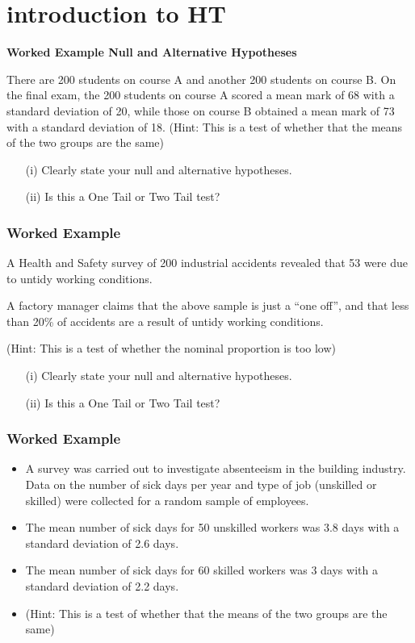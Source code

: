 \documentclass[]{report}
\begin{document}
	
\section{introduction to HT}
\noindent \textbf{Worked Example Null and Alternative Hypotheses}
{
	There are 200 students on course A and another 200 students on course B.  On the final exam, the 200 students on course A scored a mean mark of 68 with a standard deviation of 20, while those on course B obtained a mean mark of 73 with a standard deviation of 18.  
	(Hint: This is a test of whether that the means of the two groups are the same)
	
	\begin{itemize}
		\item[(i)] Clearly state your null and alternative hypotheses.
		\item[(ii)] Is this a One Tail or Two Tail test?
	\end{itemize}
	
\subsubsection{Worked Example}
A Health and Safety survey of 200 industrial accidents revealed that 53 
were due to untidy working conditions.  

A factory manager claims that the above sample is just a “one off”, and that less than 20\% of accidents are a result of untidy working conditions. 

(Hint: This is a test of whether the nominal proportion is too low)
\begin{itemize}
	\item[(i)] Clearly state your null and alternative hypotheses.
	\item[(ii)] Is this a One Tail or Two Tail test?
\end{itemize}

\subsubsection{Worked Example}

\begin{itemize}
	\item 	A survey was carried out to investigate absenteeism in the building industry.
	Data on the number of sick days per year and type of job (unskilled or skilled)
	were collected for a random sample of employees.
	\item The mean number of sick days for 50 unskilled workers was 3.8 days with a standard deviation of 2.6 days. 
	\item The mean number of sick days for 60 skilled workers was 3 days with a standard deviation of 2.2 days. 
	\item (Hint: This is a test of whether that the means of the two groups are the same)
	

\end{itemize}}
\end{document}
